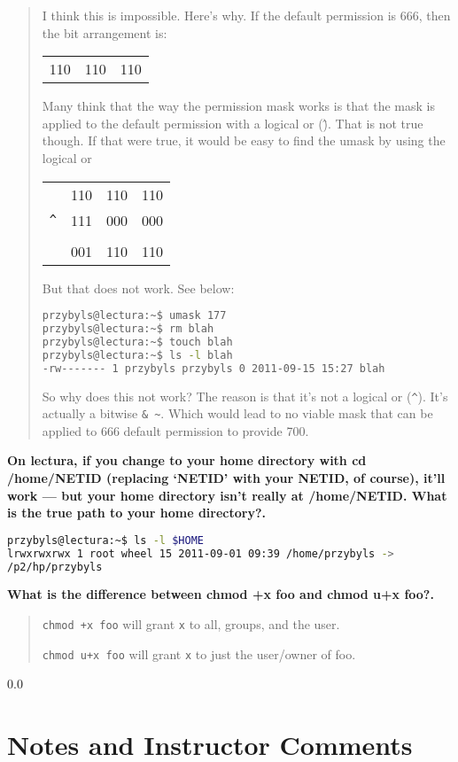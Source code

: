 \documentclass[11pt,notitlepage]{article}
\newcommand{\question}[2]{\textbf{#1.} #2}
\begin{document}
\begin{quote}
  I think this is impossible. Here's why. If the default permission is
  666, then the bit arrangement is:

\begin{tabular}{ccc}
  110 & 110 & 110 
\end{tabular}

Many think that the way the permission mask works is that the mask is
applied to the default permission with a logical or (\^). That is not
true though. If that were true, it would be easy to find the umask by
using the logical or

\begin{tabular}{cccc}
  & 110 & 110 & 110 \\
\verb|^| & 111 & 000 & 000 \\
\hline \\
& 001 & 110 & 110
\end{tabular}

But that does not work. See below:

\begin{lstlisting}[language=bash,basicstyle=\scriptsize,backgroundcolor=\color{ubergray},caption={trnapp-config.xml},frame=single,breaklines=true]
przybyls@lectura:~$ umask 177
przybyls@lectura:~$ rm blah 
przybyls@lectura:~$ touch blah
przybyls@lectura:~$ ls -l blah
-rw------- 1 przybyls przybyls 0 2011-09-15 15:27 blah
\end{lstlisting}

So why does this not work? The reason is that it's not a logical or
(\verb|^|). It's actually a bitwise \verb|& ~|. Which would lead to no
viable mask that can be applied to 666 default permission to provide 700.

\end{quote}

\question{On lectura, if you change to your home directory with cd /home/NETID (replacing ‘NETID’
with your NETID, of course), it’ll work — but your home directory isn’t really at /home/NETID.
What is the true path to your home directory?}

\begin{lstlisting}[language=bash,basicstyle=\scriptsize,backgroundcolor=\color{ubergray},caption={trnapp-config.xml},frame=single,breaklines=true]
przybyls@lectura:~$ ls -l $HOME
lrwxrwxrwx 1 root wheel 15 2011-09-01 09:39 /home/przybyls ->
/p2/hp/przybyls
\end{lstlisting}

\question{What is the difference between chmod +x foo and chmod u+x
  foo?}

\begin{quote}
\verb|chmod +x foo| will grant \verb|x| to all, groups, and the
user. 

\verb|chmod u+x foo| will grant \verb|x| to just the user/owner of foo.
\end{quote}


\newpage
  {\setlength{\baselineskip}%
           {0.0\baselineskip}
  \section*{Notes and Instructor Comments}
  \hrulefill \par}
\end{document}
